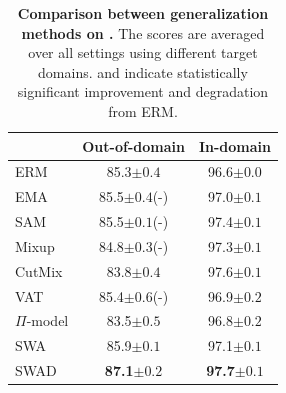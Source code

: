 \begin{table}
\vspace{-1.5em}
\caption{\small \textbf{Comparison between generalization methods on .} The scores are averaged over all settings using different target domains. \greenp{$\uparrow$} and \redp{$\downarrow$} indicate statistically significant improvement and degradation from ERM.}
\vspace{-0.5em}
\centering
\setlength{\tabcolsep}{3pt}
\begin{tabular}{@{}lcc@{}} 
\toprule
                & \multicolumn{1}{l}{Out-of-domain} & \multicolumn{1}{l}{In-domain}  \\
\midrule
ERM             & 85.3\scriptsize{$\pm0.4$} & 96.6\scriptsize{$\pm0.0$}                      \\
EMA             & 85.5{\scriptsize$\pm0.4$}(-) & 97.0{\scriptsize$\pm0.1$}\greenp{$\uparrow$}                      \\
SAM             & 85.5{\scriptsize$\pm0.1$}(-) & 97.4{\scriptsize$\pm0.1$}\greenp{$\uparrow$}                     \\
Mixup           & 84.8{\scriptsize$\pm0.3$}(-) & 97.3{\scriptsize$\pm0.1$}\greenp{$\uparrow$}                      \\
CutMix          & 83.8{\scriptsize$\pm0.4$}\redp{$\downarrow$} & 97.6{\scriptsize$\pm0.1$}\greenp{$\uparrow$}                      \\
VAT             & 85.4{\scriptsize$\pm0.6$}(-)  & 96.9{\scriptsize$\pm0.2$}\greenp{$\uparrow$}                      \\
$\Pi$-model     & 83.5{\scriptsize$\pm0.5$}\redp{$\downarrow$}  & 96.8{\scriptsize$\pm0.2$}\greenp{$\uparrow$}                      \\
\midrule
SWA      & 85.9{\scriptsize$\pm0.1$}\greenp{$\uparrow$}        & 97.1{\scriptsize$\pm0.1$}\greenp{$\uparrow$}                      \\
SWAD   & \textbf{87.1}{\scriptsize$\pm0.2$}\greenp{$\uparrow$} & \textbf{97.7}{\scriptsize$\pm0.1$}\greenp{$\uparrow$}             \\
\bottomrule
\end{tabular}
\vspace{-1em}
\label{table:generalization}
\end{table}